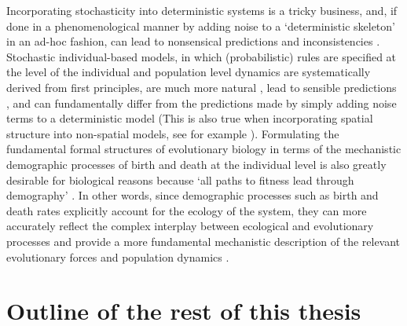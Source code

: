 Incorporating stochasticity into deterministic systems is a tricky business, and, if done in a phenomenological manner by adding noise to a `deterministic skeleton' \citep{coulson_skeletons_2004} in an ad-hoc fashion, can lead to nonsensical predictions and inconsistencies \citep{strang_how_2019}. Stochastic individual-based models, in which (probabilistic) rules are specified at the level of the individual and population level dynamics are systematically derived from first principles, are much more natural \citep{black_stochastic_2012}, lead to sensible predictions \citep{strang_how_2019}, and can fundamentally differ from the predictions made by simply adding noise terms to a deterministic model \citep{strang_how_2019} (This is also true when incorporating spatial structure into non-spatial models, see for example \cite{durrett_importance_1994}). Formulating the fundamental formal structures of evolutionary biology in terms of the mechanistic demographic processes of birth and death at the individual level is also greatly desirable for biological reasons \citep{metcalf_why_2007,geritz_mathematical_2012} because `all paths to fitness lead through demography' \citep{metcalf_all_2007}. In other words, since demographic processes such as birth and death rates explicitly account for the ecology of the system, they can more accurately reflect the complex interplay between ecological and evolutionary processes and provide a more fundamental mechanistic description of the relevant evolutionary forces and population dynamics \citep{doebeli_towards_2017}. 

\section{Outline of the rest of this thesis}

